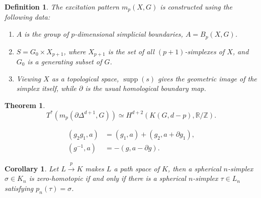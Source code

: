 \documentclass[10pt,a4paper]{amsart}
\newtheorem{definition}{Definition}
\newtheorem{theorem}{Theorem}
\newtheorem{corollary}{Corollary}
\newcommand{\RR}{{\mathbb R}}
\newcommand{\ZZ}{{\mathbb Z}}
\begin{document}
\begin{definition}\label{expSimplicialComplex}
	The excitation pattern $m_p(X,G)$ is constructed using the following data:
	\begin{enumerate}
		\item \(A\) is the group of \(p\)-dimensional simplicial boundaries, \(A = B_p(X, G)\).
		\item \(S = G_0\times X_{p+1}\), where \(X_{p+1}\) is the set of all \((p+1)\)-simplexes of $X$, and \(G_0\) is a generating subset of \(G\). 
		\item Viewing $X$ as a topological space, \(\operatorname{supp}(s)\) gives the geometric image of the simplex itself, while \(\partial\) is the usual homological boundary map.
	\end{enumerate}

\end{definition}

\begin{theorem}\label{conjectureCohomology}
	\begin{equation}
		T^*(m_p(\partial\Delta^{d+1},G))\simeq H^{d+2}(K(G,d-p),\RR/\ZZ).
	\end{equation}
\end{theorem}

\begin{equation}\label{eqTheta(g,a)}
	\begin{aligned}
		(g_2g_1,a)&=(g_1,a)+(g_2,a+\partial g_1),\\
		(g^{-1},a)&=-(g,a-\partial g).
	\end{aligned}
\end{equation}

\begin{corollary}\label{corollaryZeroHomotopic}
	Let $ L\xrightarrow{p} K$ makes $L$ a path space of $K$, then a spherical $n$-simplex $\sigma \in K_n$ is zero-homotopic if and only if there is a spherical $n$-simplex $\tau\in L_n$ satisfying $p_n(\tau)=\sigma$.
\end{corollary}
\end{document}
